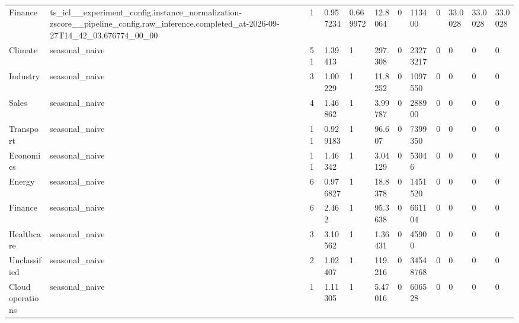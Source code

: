 \begin{tabular}{llllllllllll}
Finance & ts\_icl\_\_experiment\_config.instance\_normalization-zscore\_\_pipeline\_config.raw\_inference.completed\_at-2026-09-27T14\_42\_03.676774\_00\_00 & 1 & 0.957234 & 0.669972 & 12.8064 & 0 & 113400 & 0 & 33.0028 & 33.0028 & 33.0028 \\
Climate & seasonal\_naive & 51 & 1.39413 & 1 & 297.308 & 0 & 23273217 & 0 & 0 & 0 & 0 \\
Industry & seasonal\_naive & 3 & 1.00229 & 1 & 11.8252 & 0 & 1097550 & 0 & 0 & 0 & 0 \\
Sales & seasonal\_naive & 4 & 1.46862 & 1 & 3.99787 & 0 & 288900 & 0 & 0 & 0 & 0 \\
Transport & seasonal\_naive & 11 & 0.929183 & 1 & 96.607 & 0 & 7399350 & 0 & 0 & 0 & 0 \\
Economics & seasonal\_naive & 11 & 1.46342 & 1 & 3.04129 & 0 & 53046 & 0 & 0 & 0 & 0 \\
Energy & seasonal\_naive & 6 & 0.976827 & 1 & 18.8378 & 0 & 1451520 & 0 & 0 & 0 & 0 \\
Finance & seasonal\_naive & 6 & 2.462 & 1 & 95.3638 & 0 & 661104 & 0 & 0 & 0 & 0 \\
Healthcare & seasonal\_naive & 3 & 3.10562 & 1 & 1.36431 & 0 & 45900 & 0 & 0 & 0 & 0 \\
Unclassified & seasonal\_naive & 2 & 1.02407 & 1 & 119.216 & 0 & 34548768 & 0 & 0 & 0 & 0 \\
Cloud operations & seasonal\_naive & 1 & 1.11305 & 1 & 5.47016 & 0 & 606528 & 0 & 0 & 0 & 0 \\
\bottomrule
\end{tabular}
